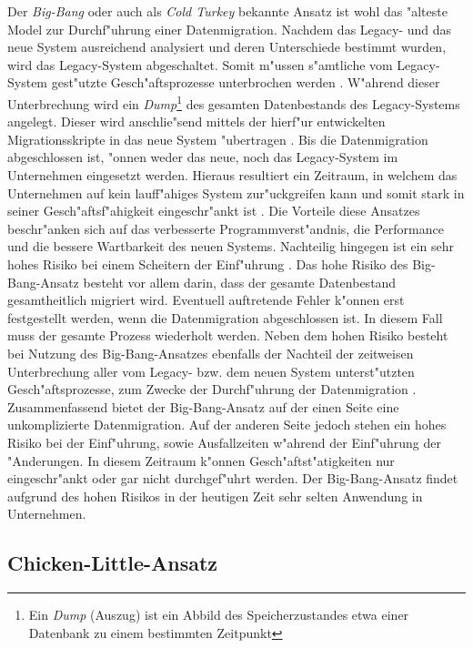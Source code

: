 Der \textit{Big-Bang} oder auch als \textit{Cold Turkey} bekannte Ansatz ist wohl das "alteste Model zur Durchf"uhrung einer Datenmigration. Nachdem das Legacy- und das neue System ausreichend analysiert und deren Unterschiede bestimmt wurden, wird das Legacy-System abgeschaltet. Somit m"ussen s"amtliche vom Legacy-System gest"utzte Gesch"aftsprozesse unterbrochen werden \citep[S.~4]{wuLawless-1997}. 
\lb
W"ahrend dieser Unterbrechung wird ein \textit{Dump}\footnote{Ein \textit{Dump} (Auszug) ist ein Abbild des Speicherzustandes etwa einer Datenbank zu einem bestimmten Zeitpunkt} des gesamten Datenbestands des Legacy-Systems angelegt. Dieser wird anschlie"send mittels der hierf"ur entwickelten Migrationsskripte in das neue System "ubertragen \citep[S.~3]{brodie-1993}. Bis die Datenmigration abgeschlossen ist, "onnen weder das neue, noch das Legacy-System im Unternehmen eingesetzt werden. Hieraus resultiert ein Zeitraum, in welchem das Unternehmen auf kein lauff"ahiges System zur"uckgreifen kann und somit stark in seiner Gesch"aftsf"ahigkeit eingeschr"ankt ist \citep[S.~3f.]{brodie-1993}.
\lb
Die Vorteile diese Ansatzes beschr"anken sich auf das verbesserte Programmverst"andnis, die Performance und die bessere Wartbarkeit des neuen Systems. Nachteilig hingegen ist ein sehr hohes Risiko bei einem Scheitern der Einf"uhrung \citep[S.~105]{bisbal-1999}. Das hohe Risiko des Big-Bang-Ansatz besteht vor allem darin, dass der gesamte Datenbestand gesamtheitlich migriert wird. Eventuell auftretende Fehler k"onnen erst festgestellt werden, wenn die Datenmigration abgeschlossen ist. In diesem Fall muss der gesamte Prozess wiederholt werden. Neben dem hohen Risiko besteht bei Nutzung des Big-Bang-Ansatzes ebenfalls der Nachteil der zeitweisen Unterbrechung aller vom Legacy- bzw. dem neuen System unterst"utzten Gesch"aftsprozesse, zum Zwecke der Durchf"uhrung der Datenmigration \citep[S.~4]{wuLawless-1997}.
\lb
Zusammenfassend bietet der Big-Bang-Ansatz auf der einen Seite eine unkomplizierte Datenmigration. Auf der anderen Seite jedoch stehen ein hohes Risiko bei der Einf"uhrung, sowie Ausfallzeiten w"ahrend der Einf"uhrung der "Anderungen. In diesem Zeitraum k"onnen Gesch"aftst"atigkeiten nur eingeschr"ankt oder gar nicht durchgef"uhrt werden. Der Big-Bang-Ansatz findet aufgrund des hohen Risikos in der heutigen Zeit sehr selten Anwendung in Unternehmen.

\subsection{Chicken-Little-Ansatz}

